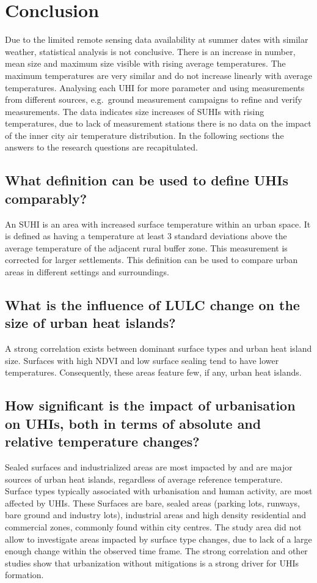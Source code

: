 \documentclass[12pt,a4paper, english,twoside]{scrartcl}
\begin{document}
\section{Conclusion}\label{sec:conclusion}
  Due to the limited remote sensing data availability at summer dates with similar weather, statistical analysis is not conclusive. 
  There is an increase in number, mean size and maximum size visible with rising average temperatures. 
  The maximum temperatures are very similar and do not increase linearly with average temperatures. 
  Analysing each \gls{UHI} for more parameter and using measurements from different sources, e.g.\ ground measurement campaigns to refine and verify measurements.
  The data indicates size increases of \glspl{SUHI} with rising temperatures, due to lack of measurement stations there is no data on the impact of the inner city air temperature distribution.
  In the following sections the answers to the research questions are recapitulated.

  \subsection{What definition can be used to define \glspl{UHI} comparably?}\label{a1} 
   An \gls{SUHI} is an area with increased surface temperature within an urban space. 
   It is defined as having a temperature at least 3 standard deviations above the average temperature of the adjacent rural buffer zone. 
   This measurement is corrected for larger settlements.
   This definition can be used to compare urban areas in different settings and surroundings. 

  \subsection{What is the influence of \gls{LULC} change on the size of urban heat islands?}\label{a2}
   A strong correlation exists between dominant surface types and urban heat island size. 
   Surfaces with high \gls{NDVI} and low surface sealing tend to have lower temperatures. 
   Consequently, these areas feature few, if any, urban heat islands.
  
  \subsection{How significant is the impact of urbanisation on \glspl{UHI}, both in terms of absolute and relative temperature changes?}\label{a3}
   Sealed surfaces and industrialized areas are most impacted by and are major sources of urban heat islands, regardless of average reference temperature.
   Surface types typically associated with urbanisation and human activity, are most affected by \glspl{UHI}.
   These Surfaces are bare, sealed areas (parking lots, runways, bare ground and industry lots), industrial areas and high density residential and commercial zones, commonly found within city centres.
   The study area did not allow to investigate areas impacted by surface type changes, due to lack of a large enough change within the observed time frame.
   The strong correlation and other studies show that urbanization without mitigations is a strong driver for \glspl{UHI} formation.
   
\end{document}
